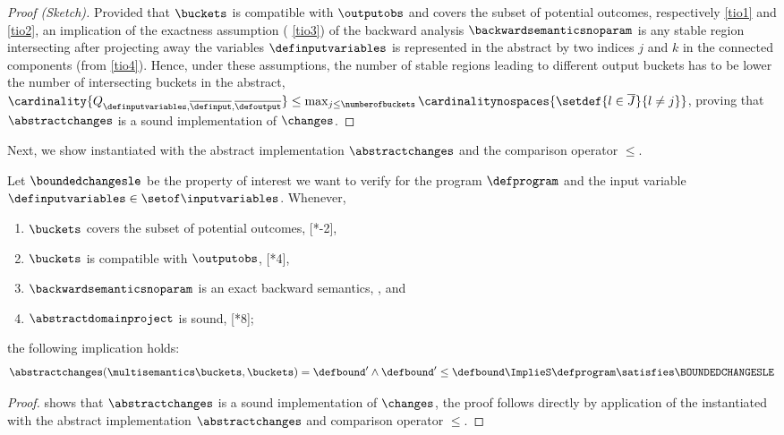 \begin{proof}[Proof (Sketch)]
  Provided that $\buckets$ is compatible with $\outputobs$ and covers the subset of potential outcomes, respectively \ref{tio1} and \ref{tio2}, an implication of the exactness assumption (\cf{} \ref{tio3}) of the backward analysis $\backwardsemanticsnoparam$ is any stable region intersecting after projecting away the variables $\definputvariables$ is represented in the abstract by two indices $j$ and $k$ in the connected components (from \ref{tio4}).
  Hence, under these assumptions, the number of stable regions leading to different output buckets has to be lower the number of intersecting buckets in the abstract, \ie $\cardinality{Q_{\definputvariables, \overline{\definput}, \overline{\defoutput}}} \le \max_{j \le \numberofbuckets} \cardinalitynospaces{\setdef{l \in \overline{J}}{l \neq j}}$, proving that $\abstractchanges$ is a sound implementation of $\changes$.
\end{proof}

Next, we show  instantiated with the abstract implementation $\abstractchanges$ and the comparison operator $\le$.

\begin{theorem} 
  Let $\boundedchangesle$ be the property of interest we want to verify for the program $\defprogram$ and the input variable $\definputvariables\in\setof\inputvariables$.
  Whenever,
  \begin{enumerate}[label=(\roman*)]
    \item $\buckets$ covers the subset of potential outcomes, \cf{} [*-2],
    \item $\buckets$ is compatible with $\outputobs$, \cf{} [*4],
    \item $\backwardsemanticsnoparam$ is an exact backward semantics, \cf{} , and
    \item $\abstractdomainproject$ is sound, \cf{} [*8];
\end{enumerate}
  the following implication holds:
  \begin{align*}
    \abstractchanges(\multisemantics\buckets, \buckets) = \defbound' \land \defbound' \le \defbound \ImplieS \defprogram \satisfies \BOUNDEDCHANGESLE
  \end{align*}
\end{theorem}
\begin{proof}
   shows that $\abstractchanges$ is a sound implementation of $\changes$, the proof follows directly by application of the  instantiated with the abstract implementation $\abstractchanges$ and comparison operator $\le$.
\end{proof}

